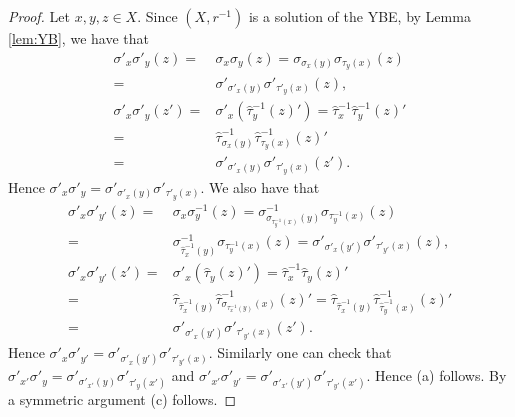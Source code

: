 \begin{proof}
Let $x,y,z\in X$. Since $(X,r^{-1})$ is a solution of the YBE, by Lemma \ref{lem:YB}, we have that
\begin{align*}
    \sigma'_{x}\sigma'_{y}(z)=&\sigma_{x}\sigma_{y}(z)=\sigma_{\sigma_x(y)}\sigma_{\tau_y(x)}(z)\\
    =&\sigma'_{\sigma'_x(y)}\sigma'_{\tau'_y(x)}(z),\\
        \sigma'_{x}\sigma'_{y}(z')=&\sigma'_{x}(\widehat{\tau}^{-1}_{y}(z)')=\widehat{\tau}^{-1}_{x}\widehat{\tau}^{-1}_{y}(z)'\\
        =&\widehat{\tau}^{-1}_{\sigma_x(y)}\widehat{\tau}^{-1}_{\tau_y(x)}(z)'\\
    =&\sigma'_{\sigma'_x(y)}\sigma'_{\tau'_y(x)}(z').
    \end{align*}
Hence $\sigma'_x\sigma'_y=\sigma'_{\sigma'_x(y)}\sigma'_{\tau'_y(x)}$. We also have that   
\begin{align*}
    \sigma'_{x}\sigma'_{y'}(z)=&\sigma_{x}\sigma^{-1}_{y}(z)=\sigma^{-1}_{\sigma_{\tau^{-1}_y(x)}(y)}\sigma_{\tau^{-1}_y(x)}(z)\\
    =&\sigma^{-1}_{\widehat{\tau}^{-1}_x(y)}\sigma_{\tau^{-1}_y(x)}(z)=\sigma'_{\sigma'_x(y')}\sigma'_{\tau'_{y'}(x)}(z),\\
        \sigma'_{x}\sigma'_{y'}(z')=&\sigma'_{x}(\widehat{\tau}_{y}(z)')=\widehat{\tau}^{-1}_{x}\widehat{\tau}_{y}(z)'\\
        =&\widehat{\tau}_{\widehat{\tau}^{-1}_x(y)}\widehat{\tau}^{-1}_{\sigma_{\tau^{-1}_x(y)}(x)}(z)'=\widehat{\tau}_{\widehat{\tau}^{-1}_x(y)}\widehat{\tau}^{-1}_{\widehat{\tau}^{-1}_y(x)}(z)'\\
    =&\sigma'_{\sigma'_x(y')}\sigma'_{\tau'_{y'}(x)}(z').
    \end{align*}
Hence $\sigma'_x\sigma'_{y'}=\sigma'_{\sigma'_x(y')}\sigma'_{\tau'_{y'}(x)}$. Similarly one can check that
$\sigma'_{x'}\sigma'_{y}=\sigma'_{\sigma'_{x'}(y)}\sigma'_{\tau'_{y}(x')}$ and $\sigma'_{x'}\sigma'_{y'}=\sigma'_{\sigma'_{x'}(y')}\sigma'_{\tau'_{y'}(x')}$. Hence (a) follows.
By a symmetric argument (c) follows.


\end{proof}
